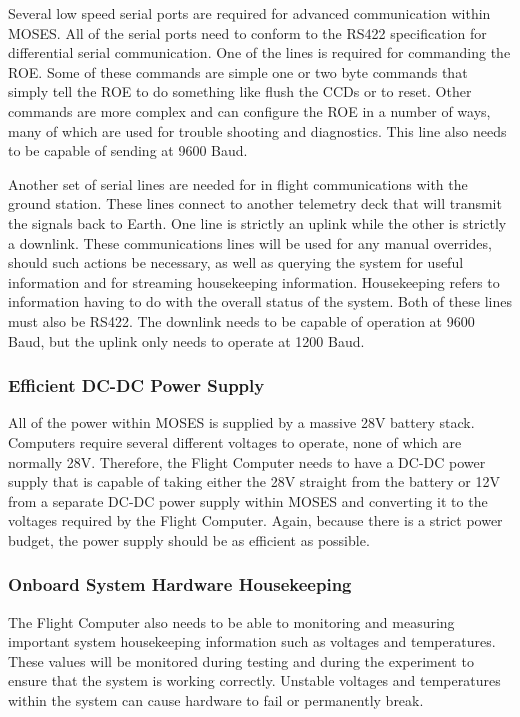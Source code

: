 \documentclass[11pt,titlepage]{article}
\begin{document}
Several low speed serial ports are required for advanced communication within MOSES. All of the serial ports need to conform to the RS422 specification
for differential serial communication. One of the lines is required for commanding the ROE. Some of these commands are simple one or two byte commands that
simply tell the ROE to do something like flush the CCDs or to reset. Other commands are more complex and can configure the ROE in a number of ways, many
of which are used for trouble shooting and diagnostics. This line also needs to be capable of sending at 9600 Baud.

Another set of serial lines are needed for in flight communications with the ground station. These lines connect to another telemetry deck that will transmit
the signals back to Earth. One line is strictly an uplink while the other is strictly a downlink.
These communications lines will be used for any manual overrides, should such actions be necessary, as well as querying the system for useful information
and for streaming housekeeping information. Housekeeping refers to information having to do with the overall status of the system. Both of these lines must
also be RS422. The downlink needs to be capable of operation at 9600 Baud, but the uplink only needs to operate at 1200 Baud.

\subsubsection{Efficient DC-DC Power Supply}

All of the power within MOSES is supplied by a massive 28V battery stack. Computers require several different voltages to operate, none of which are normally
28V. Therefore, the Flight Computer needs to have a DC-DC power supply that is capable of taking either the 28V straight from the battery or 12V from a 
separate DC-DC power supply within MOSES and converting it to the voltages required by the Flight Computer. Again, because there is a strict power budget,
the power supply should be as efficient as possible.

\subsubsection{Onboard System Hardware Housekeeping}

The Flight Computer also needs to be able to monitoring and measuring important system housekeeping information such as voltages and temperatures. These
values will be monitored during testing and during the experiment to ensure that the system is working correctly. Unstable voltages and temperatures
within the system can cause hardware to fail or permanently break.
\end{document}
